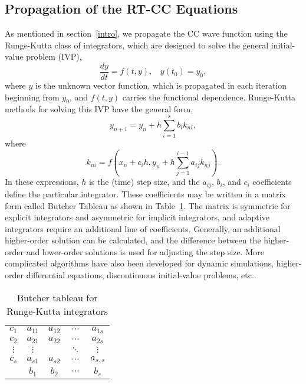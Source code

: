 \subsection{Propagation of the RT-CC Equations} \label{theory_1}

As mentioned in section~\ref{intro}, we propagate the CC wave function using the Runge-Kutta class of 
integrators, which are designed to solve the general initial-value problem (IVP),
\begin{equation}
\frac{dy}{dt} = f(t, y), \ \ \ \ y(t_0) = y_0,
\label{Eq:IVP}
\end{equation}
where $y$ is the unknown vector function, which is propagated in each iteration beginning from $y_0$, and $f(t,
y)$ carries the functional dependence. 
Runge-Kutta methods for solving this IVP have the general form,
\begin{equation}\label{eq:rk_y}
  y_{n+1} = y_{n} + h\sum_{i=1}^{s}b_{i}k_{ni},
\end{equation}
where
\begin{equation}\label{eq:rk_k}
  k_{ni} = f(x_{n} + c_{i}h, y_{n} + h\sum_{j=1}^{i-1}a_{ij}k_{nj}).
\end{equation}
In these expressions, $h$ is the (time) step size, and the $a_{ij}$, $b_i$,
and $c_i$ coefficients define the particular integrator.  These coefficients
may be written in a matrix form called Butcher Tableau\cite{Butcher1963} as
shown in Table~\ref{tab:butcher}. The matrix is symmetric for explicit
integrators and asymmetric for implicit integrators, and adaptive integrators
require an additional line of coefficients.\cite{Press1992} Generally, an
additional higher-order solution can be calculated, and the difference between
the higher-order and lower-order solutions is used for adjusting the step
size. More complicated algorithms have also been developed for dynamic
simulations, higher-order differential equations, discontinuous initial-value
problems, etc.\cite{Bastani2007, Cameron1988}.
\begin{table}
    \centering
    \caption{Butcher tableau for Runge-Kutta integrators}
    \begin{tabular}{c|cccc}
       $c_{1}$ & $a_{11}$ & $a_{12}$ & $\cdots$ & $a_{1s}$\\ 
       $c_{2}$ & $a_{21}$ & $a_{22}$ & $\cdots$ & $a_{2s}$\\
       $\vdots$ & $\vdots$ & $ $ & $\ddots$ & $\vdots$ \\
       $c_{s}$ & $a_{s1}$ & $a_{s2}$ & $\cdots$ & $a_{s,s}$\\ \hline
        $ $ & $b_{1}$ & $b_{2}$ & $\cdots$ & $b_{s}$
\end{tabular}
\label{tab:butcher}
\end{table}

